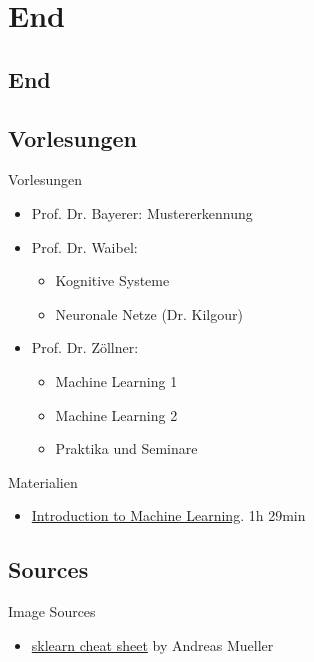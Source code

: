 \section*{End}
\subsection*{End}

\subsection{Vorlesungen}
\begin{frame}{Vorlesungen}
    \begin{itemize}
        \item Prof. Dr. Bayerer: Mustererkennung
        \item Prof. Dr. Waibel:
        \begin{itemize}
            \item Kognitive Systeme
            \item Neuronale Netze (Dr. Kilgour)
        \end{itemize}
        \item Prof. Dr. Zöllner:
        \begin{itemize}
            \item Machine Learning 1
            \item Machine Learning 2
            \item Praktika und Seminare
        \end{itemize}
    \end{itemize}
\end{frame}

\begin{frame}{Materialien}
    \begin{itemize}
        \item \href{http://videolectures.net/deeplearning2015_vincent_machine_learning/}{Introduction to Machine Learning}. 1h 29min
    \end{itemize}
\end{frame}

\subsection*{Sources}
\begin{frame}{Image Sources}
    \begin{itemize}
        \item \href{http://peekaboo-vision.blogspot.de/2013/01/machine-learning-cheat-sheet-for-scikit.html}{sklearn cheat sheet} by  Andreas Mueller
    \end{itemize}
\end{frame}